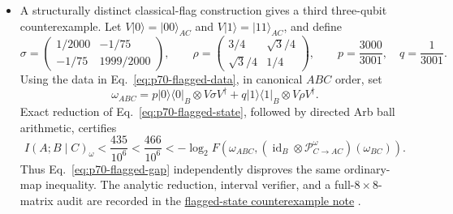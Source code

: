 \begin{itemize}
\begin{equation}
\begin{aligned}
    -0.004412&<I(A;B\mid C)_\rho+\log_2F(\rho_{ABC},\sigma_{ABC})<-0.0044<0.
  \end{aligned}
  \label{eq:p70-certified-gap}
\end{equation}
Equation~\eqref{eq:p70-certified-gap} disproves the universal inequality
with exactly the map and squared-fidelity convention in the statement.
A second, rank-two example has a separately certified gap between
$-0.000881$ and $-0.000880$. Both constructions, their exact fidelity
matrices, and an independently written verifier are recorded in the
\href{https://github.com/Naixu-Guo/quantum-open-problems/blob/main/database/proofs/ordinary-petz.md}{counterexample note}
.

  \item A structurally distinct classical-flag construction gives a third
three-qubit counterexample. Let $V|0\rangle=|00\rangle_{AC}$ and
$V|1\rangle=|11\rangle_{AC}$, and define
\begin{equation}
  \sigma=\begin{pmatrix}1/2000&-1/75\\-1/75&1999/2000\end{pmatrix},
  \qquad
  \rho=\begin{pmatrix}3/4&\sqrt3/4\\\sqrt3/4&1/4\end{pmatrix},
  \qquad p=\frac{3000}{3001},\quad q=\frac1{3001}.
  \label{eq:p70-flagged-data}
\end{equation}
Using the data in Eq.~\eqref{eq:p70-flagged-data}, in canonical
$ABC$ order, set
\begin{equation}
  \omega_{ABC}=p|0\rangle\!\langle0|_B\otimes V\sigma V^\dagger
  +q|1\rangle\!\langle1|_B\otimes V\rho V^\dagger.
  \label{eq:p70-flagged-state}
\end{equation}
Exact reduction of Eq.~\eqref{eq:p70-flagged-state}, followed by directed
Arb ball arithmetic, certifies
\begin{equation}
  I(A;B\mid C)_\omega<\frac{435}{10^6}
  <\frac{466}{10^6}
  <-\log_2 F\!\left(\omega_{ABC},
    (\operatorname{id}_B\otimes\mathcal P^\omega_{C\to AC})(\omega_{BC})
  \right).
  \label{eq:p70-flagged-gap}
\end{equation}
Thus Eq.~\eqref{eq:p70-flagged-gap} independently disproves the same
ordinary-map inequality. The analytic reduction, interval verifier, and a
full-$8\times8$-matrix audit are recorded in the
\href{https://github.com/Naixu-Guo/quantum-open-problems/blob/main/database/proofs/ordinary-petz-flagged.md}{flagged-state counterexample note}
.


\end{itemize}
